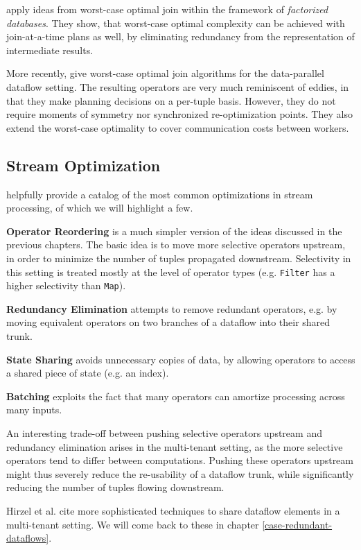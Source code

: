 \documentclass[../index.tex]{subfiles}
\begin{document}
\cite{ciucanu2015worst} apply ideas from worst-case optimal join
within the framework of \emph{factorized databases}. They show, that
worst-case optimal complexity can be achieved with join-at-a-time
plans as well, by eliminating redundancy from the representation of
intermediate results.

More recently, \cite{ammar2018distributed} give worst-case optimal
join algorithms for the data-parallel dataflow setting. The resulting
operators are very much reminiscent of eddies, in that they make
planning decisions on a per-tuple basis. However, they do not require
moments of symmetry nor synchronized re-optimization points. They also
extend the worst-case optimality to cover communication costs between
workers.

\subsection{Stream Optimization}

\cite{hirzel2014catalog} helpfully provide a catalog of the most
common optimizations in stream processing, of which we will highlight
a few.

\textbf{Operator Reordering} is a much simpler version of the ideas
discussed in the previous chapters. The basic idea is to move more
selective operators upstream, in order to minimize the number of
tuples propagated downstream. Selectivity in this setting is treated
mostly at the level of operator types (e.g. \texttt{Filter} has a
higher selectivity than \texttt{Map}).

\textbf{Redundancy Elimination} attempts to remove redundant operators,
e.g. by moving equivalent operators on two branches of a dataflow into
their shared trunk.

\textbf{State Sharing} avoids unnecessary copies of data, by allowing
operators to access a shared piece of state (e.g. an index).

\textbf{Batching} exploits the fact that many operators can amortize
processing across many inputs.

An interesting trade-off between pushing selective operators upstream
and redundancy elimination arises in the multi-tenant setting, as the
more selective operators tend to differ between computations. Pushing
these operators upstream might thus severely reduce the re-usability
of a dataflow trunk, while significantly reducing the number of tuples
flowing downstream. 

Hirzel et al. cite more sophisticated techniques to share dataflow
elements in a multi-tenant setting. We will come back to these in
chapter \ref{case-redundant-dataflows}.
\end{document}
